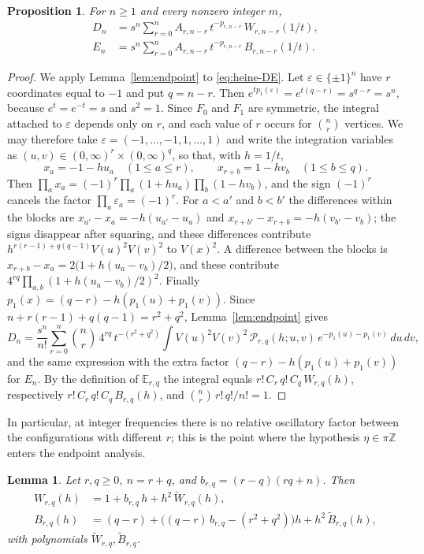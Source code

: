 \documentclass[11pt]{amsart}
\newtheorem{proposition}[theorem]{Proposition}
\newtheorem{lemma}[theorem]{Lemma}
\theoremstyle{remark}
\numberwithin{equation}{section}
\newcommand{\Z}{\mathbb{Z}}
\newcommand{\E}{\mathbb{E}}
\begin{document}
\begin{proposition}\label{prop:clusters}
For $n\ge1$ and every nonzero integer $m$,
\begin{align*}
D_n&=s^n\sum_{r=0}^nA_{r,n-r}\,t^{-p_{r,n-r}}\,W_{r,n-r}(1/t),\\
E_n&=s^n\sum_{r=0}^nA_{r,n-r}\,t^{-p_{r,n-r}}\,B_{r,n-r}(1/t).
\end{align*}
\end{proposition}

\begin{proof}
We apply Lemma~\ref{lem:endpoint} to \eqref{eq:heine-DE}. Let $\varepsilon\in\{\pm1\}^n$ have $r$ coordinates equal to $-1$ and put $q=n-r$. Then $e^{tp_1(\varepsilon)}=e^{t(q-r)}=s^{q-r}=s^n$, because $e^{t}=e^{-t}=s$ and $s^2=1$. Since $F_0$ and $F_1$ are symmetric, the integral attached to $\varepsilon$ depends only on $r$, and each value of $r$ occurs for $\binom nr$ vertices. We may therefore take $\varepsilon=(-1,\dots,-1,1,\dots,1)$ and write the integration variables as $(u,v)\in(0,\infty)^r\times(0,\infty)^q$, so that, with $h=1/t$,
\[
x_a=-1-hu_a\quad(1\le a\le r),\qquad x_{r+b}=1-hv_b\quad(1\le b\le q).
\]
Then $\prod_ax_a=(-1)^r\prod_a(1+hu_a)\prod_b(1-hv_b)$, and the sign $(-1)^r$ cancels the factor $\prod_a\varepsilon_a=(-1)^r$. For $a<a'$ and $b<b'$ the differences within the blocks are $x_{a'}-x_a=-h(u_{a'}-u_a)$ and $x_{r+b'}-x_{r+b}=-h(v_{b'}-v_b)$; the signs disappear after squaring, and these differences contribute $h^{r(r-1)+q(q-1)}V(u)^2V(v)^2$ to $V(x)^2$. A difference between the blocks is $x_{r+b}-x_a=2\bigl(1+h(u_a-v_b)/2\bigr)$, and these contribute $4^{rq}\prod_{a,b}(1+h(u_a-v_b)/2)^2$. Finally $p_1(x)=(q-r)-h(p_1(u)+p_1(v))$. Since $n+r(r-1)+q(q-1)=r^2+q^2$, Lemma~\ref{lem:endpoint} gives
\[
D_n=\frac{s^n}{n!}\sum_{r=0}^n\binom nr\,4^{rq}\,t^{-(r^2+q^2)}\int V(u)^2V(v)^2\,\mathcal P_{r,q}(h;u,v)\,e^{-p_1(u)-p_1(v)}\,du\,dv,
\]
and the same expression with the extra factor $(q-r)-h(p_1(u)+p_1(v))$ for $E_n$. By the definition of $\E_{r,q}$ the integral equals $r!\,C_r\,q!\,C_q\,W_{r,q}(h)$, respectively $r!\,C_r\,q!\,C_q\,B_{r,q}(h)$, and $\binom nr\,r!\,q!/n!=1$.
\end{proof}

In particular, at integer frequencies there is no relative oscillatory factor between the configurations with different $r$; this is the point where the hypothesis $\eta\in\pi\Z$ enters the endpoint analysis.

\begin{lemma}\label{lem:linear}
Let $r,q\ge0$, $n=r+q$, and $b_{r,q}=(r-q)(rq+n)$. Then
\begin{align*}
W_{r,q}(h)&=1+b_{r,q}\,h+h^2\,\widetilde W_{r,q}(h),\\
B_{r,q}(h)&=(q-r)+\bigl((q-r)\,b_{r,q}-(r^2+q^2)\bigr)h+h^2\,\widetilde B_{r,q}(h),
\end{align*}
with polynomials $\widetilde W_{r,q},\widetilde B_{r,q}$.
\end{lemma}
\end{document}
